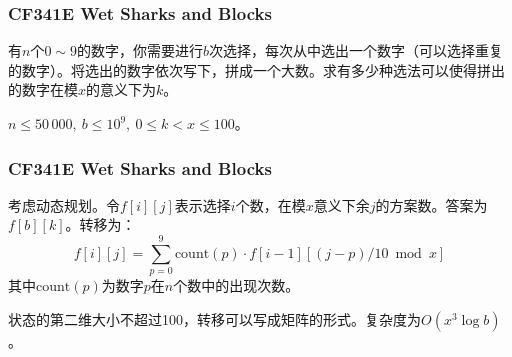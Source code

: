 \documentclass[9pt,dvipsnames]{beamer}
\begin{document}
\begin{frame}
	\frametitle{CF341E Wet Sharks and Blocks}
	有$n$个$0\sim 9$的数字，你需要进行$b$次选择，每次从中选出一个数字（可以选择重复的数字）。将选出的数字依次写下，拼成一个大数。求有多少种选法可以使得拼出的数字在模$x$的意义下为$k$。

	$n\leq 50\,000,\ b\leq 10^9,\ 0\leq k<x\leq 100$。
\end{frame}
\begin{frame}
	\frametitle{CF341E Wet Sharks and Blocks}
	考虑动态规划。令$f[i][j]$表示选择$i$个数，在模$x$意义下余$j$的方案数。答案为$f[b][k]$。转移为：
	\[ f[i][j] = \sum_{p=0}^{9}\mathrm{count}(p)\cdot f[i-1][(j-p)/10\bmod{x}] \]
	其中$\mathrm{count}(p)$为数字$p$在$n$个数中的出现次数。\pause

	状态的第二维大小不超过100，转移可以写成矩阵的形式。复杂度为$O(x^3\log b)$。
\end{frame}
\end{document}
